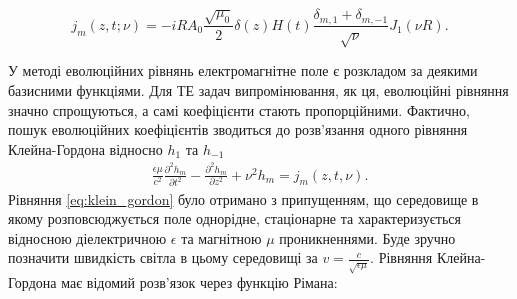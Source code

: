 \begin{equation} 
j_m (z, t; \nu) = - i R A_0 \frac{\sqrt{\mu_0}}{2} \delta(z) H(t) 
\frac{\delta_{m,1} + \delta_{m,-1}}{\sqrt{\nu}} J_1 (\nu R).
\end{equation}

У методі еволюційних рівнянь електромагнітне поле є розкладом за 
деякими базисними функціями. Для ТЕ задач випромінювання, як ця, еволюційні 
рівняння значно спрощуються, а самі коефіцієнти стають пропорційними.
Фактично, пошук еволюційних коефіцієнтів зводиться до розв'язання одного
рівняння Клейна-Гордона відносно $ h_1 $ та $ h_{-1} $
%
%
%
%
\begin{equation} \begin{aligned} \label{eq:klein_gordon}
\frac{\epsilon \mu}{c^2} \frac{\partial^2 h_m}{\partial t^2} - 
\frac{\partial^2 h_m}{\partial z^2} + \nu^2 h_m = j_m (z,t,\nu).
\end{aligned} \end{equation}
%
Рівняння \eqref{eq:klein_gordon} було отримано з припущенням, що середовище 
в якому розповсюджується поле однорідне, стаціонарне та характеризується 
відносною діелектричною $ \epsilon $ та магнітною $ \mu $ проникненнями.
Буде зручно позначити швидкість світла в цьому середовищі за 
$ v = \frac{c}{\sqrt{\epsilon \mu}} $. Рівняння Клейна-Гордона
має відомий розв'язок через функцію Рімана:

